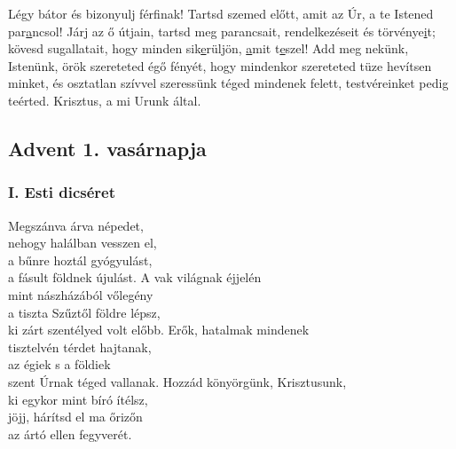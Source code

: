 \documentclass[twoside]{article}
\begin{document}
Légy bátor és bizonyulj férf\underline{i}nak! Tartsd szemed előtt, amit az Úr, a te Istened par\underline{a}ncsol! Járj az ő útjain, tartsd meg parancsait, rendelkezéseit és törvénye\underline{i}t; kövesd sugallatait, hogy minden sik\underline{e}rüljön, \underline{a}mit t\underline{e}szel!
Add meg nekünk, Istenünk, örök szereteted égő fényét, hogy mindenkor szereteted tüze hevítsen minket, és osztatlan szívvel szeressünk téged mindenek felett, testvéreinket pedig teérted. Krisztus, a mi Urunk által.


\subsection*{Advent 1. vasárnapja}
\subsubsection*{I. Esti dicséret}



\begin{hymnstanzas}
    Megszánva árva népedet,\\
    nehogy halálban vesszen el,\\
    a bűnre hoztál gyógyulást,\\
    a fásult földnek újulást.
\stanzabreak
    A vak világnak éjjelén\\
    mint nászházából vőlegény\\
    a tiszta Szűztől földre lépsz,\\
    ki zárt szentélyed volt előbb.
\stanzabreak
    Erők, hatalmak mindenek\\
    tisztelvén térdet hajtanak,\\
    az égiek s a földiek\\
    szent Úrnak téged vallanak.
\stanzabreak
    Hozzád könyörgünk, Krisztusunk,\\
    ki egykor mint bíró ítélsz,\\
    jöjj, hárítsd el ma őrizőn\\
    az ártó ellen fegyverét.
\end{hymnstanzas}
\end{document}

